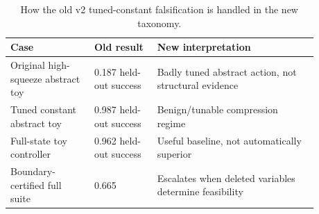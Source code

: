 \begin{table}[t]
\centering
\caption{How the old v2 tuned-constant falsification is handled in the new taxonomy.}
\label{tab:v2-reconciliation}
\small
\begin{tabular}{p{0.24\linewidth}p{0.18\linewidth}p{0.46\linewidth}}
\toprule
Case & Old result & New interpretation \\
\midrule
Original high-squeeze abstract toy & 0.187 held-out success & Badly tuned abstract action, not structural evidence \\
Tuned constant abstract toy & 0.987 held-out success & Benign/tunable compression regime \\
Full-state toy controller & 0.962 held-out success & Useful baseline, not automatically superior \\
Boundary-certified full suite & 0.665 & Escalates when deleted variables determine feasibility \\
\bottomrule
\end{tabular}
\end{table}
